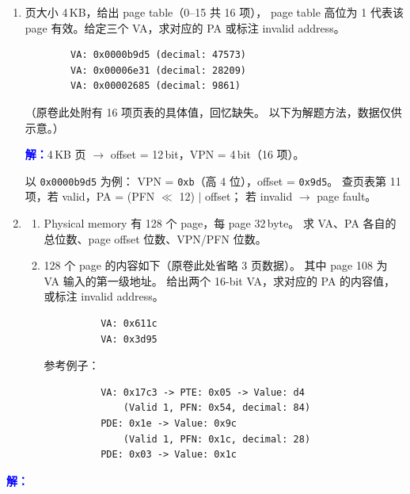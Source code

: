 \documentclass[11pt,a4paper]{article}
\newcommand{\ans}{\par\noindent\textcolor{blue}{\textbf{解：}}}
\begin{document}
\begin{enumerate}[label=(\arabic*),leftmargin=*]
  \item 页大小 4\,KB，给出 page table（0--15 共 16 项），
        page table 高位为 1 代表该 page 有效。给定三个 VA，求对应的 PA
        或标注 invalid address。

        \begin{verbatim}
        VA: 0x0000b9d5 (decimal: 47573)
        VA: 0x00006e31 (decimal: 28209)
        VA: 0x00002685 (decimal: 9861)
        \end{verbatim}

        （原卷此处附有 16 项页表的具体值，回忆缺失。
         以下为解题方法，数据仅供示意。）

        \ans 4\,KB 页 $\to$ offset = 12\,bit，VPN = 4\,bit（16 项）。

        以 \texttt{0x0000b9d5} 为例：
        VPN = \texttt{0xb}（高 4 位），offset = \texttt{0x9d5}。
        查页表第 11 项，若 valid，PA = (PFN $\ll$ 12) $|$ offset；
        若 invalid $\to$ page fault。

  \item
  \begin{enumerate}[label=(\alph*)]
    \item Physical memory 有 128 个 page，每 page 32\,byte。
          求 VA、PA 各自的总位数、page offset 位数、VPN/PFN 位数。

    \item 128 个 page 的内容如下（原卷此处省略 3 页数据）。
          其中 page 108 为 VA 输入的第一级地址。
          给出两个 16-bit VA，求对应的 PA 的内容值，
          或标注 invalid address。

          \begin{verbatim}
          VA: 0x611c
          VA: 0x3d95
          \end{verbatim}

          参考例子：
          \begin{verbatim}
          VA: 0x17c3 -> PTE: 0x05 -> Value: d4
              (Valid 1, PFN: 0x54, decimal: 84)
          PDE: 0x1e -> Value: 0x9c
              (Valid 1, PFN: 0x1c, decimal: 28)
          PDE: 0x03 -> Value: 0x1c
          \end{verbatim}
  \end{enumerate}
\end{enumerate}

\ans
\end{document}
